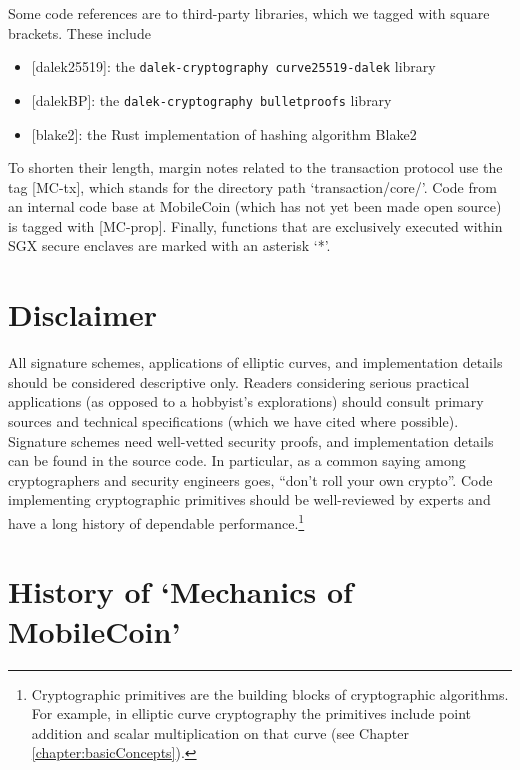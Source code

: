 Some code references are to third-party libraries, which we tagged with square brackets. These include
\begin{itemize}
    \item {[dalek25519]}: the {\tt dalek-cryptography curve25519-dalek} library \cite{dalek-curve25519-lib}
    \item {[dalekBP]}: the {\tt dalek-cryptography bulletproofs} library \cite{dalek-bulletproofs-lib}
    \item {[blake2]}: the Rust implementation \cite{blake2-rust-lib} of hashing algorithm Blake2 \cite{blake-hashing-algorithm}
\end{itemize}

To shorten their length, margin notes related to the transaction protocol use the tag [MC-tx], which stands for the directory path `transaction/core/'. Code from an internal code base at MobileCoin (which has not yet been made open source) is tagged with [MC-prop]. Finally, functions that are exclusively executed within SGX secure enclaves are marked with an asterisk `*'.


\section{Disclaimer}

All signature schemes, applications of elliptic curves, and implementation details should be considered descriptive only. Readers considering serious practical applications (as opposed to a hobbyist's explorations) should consult primary sources and technical specifications (which we have cited where possible). Signature schemes need well-vetted security proofs, and implementation details can be found in the source code. In particular, as a common saying among cryptographers and security engineers goes, ``don't roll your own crypto''. Code implementing cryptographic primitives should be well-reviewed by experts and have a long history of dependable performance.\footnote{Cryptographic primitives are the building blocks of cryptographic algorithms. For example, in elliptic curve cryptography the primitives include point addition and scalar multiplication on that curve (see Chapter \ref{chapter:basicConcepts}).} %



\section{History of `Mechanics of MobileCoin'}


